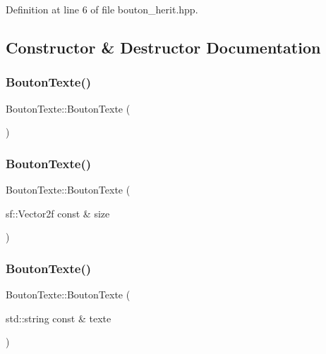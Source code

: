 Definition at line 6 of file bouton\+\_\+herit.\+hpp.



\subsection{Constructor \& Destructor Documentation}
\mbox{\label{classBoutonTexte_a2a7d9babee8e65e776e83e5765e1ce60}} 
\subsubsection{\texorpdfstring{Bouton\+Texte()}{BoutonTexte()}\hspace{0.1cm}{\footnotesize\ttfamily [1/8]}}
{\footnotesize\ttfamily Bouton\+Texte\+::\+Bouton\+Texte (\begin{DoxyParamCaption}{ }\end{DoxyParamCaption})}

\mbox{\label{classBoutonTexte_a1051f539ed840e2552725892d9a57194}} 
\subsubsection{\texorpdfstring{Bouton\+Texte()}{BoutonTexte()}\hspace{0.1cm}{\footnotesize\ttfamily [2/8]}}
{\footnotesize\ttfamily Bouton\+Texte\+::\+Bouton\+Texte (\begin{DoxyParamCaption}\item[{sf\+::\+Vector2f const \&}]{size }\end{DoxyParamCaption})}

\mbox{\label{classBoutonTexte_ad48d557bfa607a183f57485f32795264}} 
\subsubsection{\texorpdfstring{Bouton\+Texte()}{BoutonTexte()}\hspace{0.1cm}{\footnotesize\ttfamily [3/8]}}
{\footnotesize\ttfamily Bouton\+Texte\+::\+Bouton\+Texte (\begin{DoxyParamCaption}\item[{std\+::string const \&}]{texte }\end{DoxyParamCaption})}

